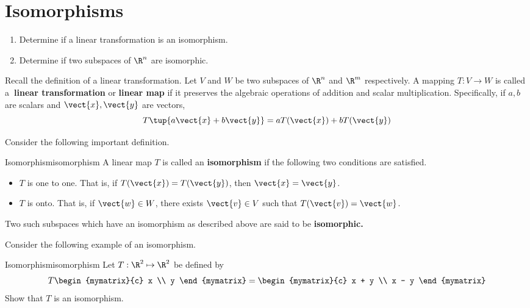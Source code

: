 \section{Isomorphisms}

\begin{outcome}
  \begin{enumerate}
  \item Determine if a linear transformation is an isomorphism.
  \item Determine if two subspaces of $\R^n$ are isomorphic. 
  \end{enumerate}
\end{outcome}

Recall the definition of a linear transformation. Let $V$ and $W$ be two subspaces of $\R^{n}$ and $\R^{m}$
respectively. A mapping $T:V\rightarrow W$ is called a\textbf{\ linear
transformation} or \textbf{linear map} if it preserves the algebraic
operations of addition and
 scalar multiplication. Specifically, if $a,b$
are scalars and $
\vect{x},\vect{y}$ are vectors, 
\begin{equation*}
T\tup{a\vect{x}+b\vect{y}} =aT(\vect{x})+bT(\vect{y})
\end{equation*}

Consider the following important definition.

\begin{definition}{Isomorphism}{isomorphism}
A linear map $T$ is called an \textbf{isomorphism} 
if the following two conditions are satisfied.

\begin{itemize}
\item $T$ is one to one. That is, if $T(\vect{x})=T(\vect{y})$, then $\vect{x}=\vect{y}$.

\item $T$ is onto. That is, if $\vect{w}\in W$, there exists $
\vect{v}\in V$ such that $T(\vect{v})=\vect{w}$.
\end{itemize}

Two such subspaces which have an isomorphism as described above are said to
be \textbf{isomorphic.}
\end{definition}

Consider the following example of an isomorphism.

\begin{example}{Isomorphism}{isomorphism}
Let $T: \R^2 \mapsto \R^2$ be defined by 
\[
T \begin{mymatrix}{c}
x \\
y
\end{mymatrix} = \begin{mymatrix}{c}
x + y \\
x - y 
\end{mymatrix}
\]
Show that $T$ is an isomorphism.
\end{example}

